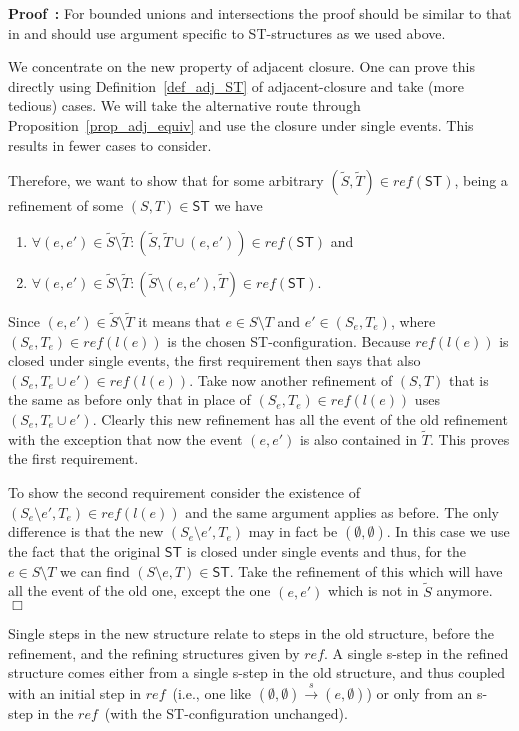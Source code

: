 \documentclass[submission,copyright,creativecommons]{eptcs}
\newenvironment{proof}[1][\!\!\,]{\vspace{1ex}\noindent\textbf{Proof #1: }}{\hfill$\Box$\vspace{2ex}}
\newcommand{\cp}[1]{}
\newcounter{case}
\newcommand\ST{\ensuremath{\mathsf{ST}}}
\newcommand\reffun{\ensuremath{\mathit{ref}}}
\newcommand\refinement[1]{\ensuremath{\widetilde{#1}}}
\newcommand{\transition}[1]{\ensuremath{\xrightarrow{#1}}}
\begin{document}
\begin{proof}
For bounded unions and intersections the proof should be similar to that in \cite[Prop.5.6]{GlabbeekG01refinement} and should use argument specific to ST-structures as we used above.

We concentrate on the new property of adjacent closure. 
One can prove this directly using Definition~\ref{def_adj_ST} of adjacent-closure and take (more tedious) cases.
We will take the alternative route through Proposition~\ref{prop_adj_equiv} and use the closure under single events. This results in fewer cases to consider.

Therefore, we want to show that for some arbitrary $(\refinement{S},\refinement{T})\in\reffun(\ST)$, being a refinement of some $(S,T)\in\ST$ we have
\begin{enumerate}
\item $\forall (e,e')\in\refinement{S}\setminus\refinement{T}:(\refinement{S},\refinement{T}\cup(e,e'))\in\reffun(\ST)$ and
\item $\forall (e,e')\in\refinement{S}\setminus\refinement{T}:(\refinement{S}\setminus(e,e'),\refinement{T})\in\reffun(\ST)$.
\end{enumerate}
Since $(e,e')\in\refinement{S}\setminus\refinement{T}$ it means that $e\in S\setminus T$ and $e'\in(S_{e},T_{e})$, where $(S_{e},T_{e})\in\reffun(l(e))$ is the chosen ST-configuration. Because $\reffun(l(e))$ is closed under single events, the first requirement then says that also $(S_{e},T_{e}\cup e')\in\reffun(l(e))$. Take now another refinement of $(S,T)$ that is the same as before only that in place of $(S_{e},T_{e})\in\reffun(l(e))$ uses $(S_{e},T_{e}\cup e')$. Clearly this new refinement has all the event of the old refinement with the exception that now the event $(e,e')$ is also contained in $\refinement{T}$. This proves the first requirement.

To show the second requirement consider the existence of $(S_{e}\setminus e',T_{e})\in\reffun(l(e))$ and the same argument applies as before. The only difference is that the new $(S_{e}\setminus e',T_{e})$ may in fact be $(\emptyset,\emptyset)$. In this case we use the fact that the original $\ST$ is closed under single events and thus, for the $e\in S\setminus T$ we can find $(S\setminus e,T)\in\ST$. Take the refinement of this which will have all the event of the old one, except the one $(e,e')$ which is not in $\refinement{S}$ anymore.
\end{proof}

Single steps in the new structure relate to steps in the old structure, before the refinement, and the refining structures given by \reffun. A single s-step in the refined structure comes either from a single s-step in the old structure, and thus coupled with an initial step in \reffun\ (i.e., one like $(\emptyset,\emptyset)\transition{s}(e,\emptyset)$) or only from an s-step in the \reffun\ (with the ST-configuration unchanged). \cp{What about t-steps??}
\end{document}
